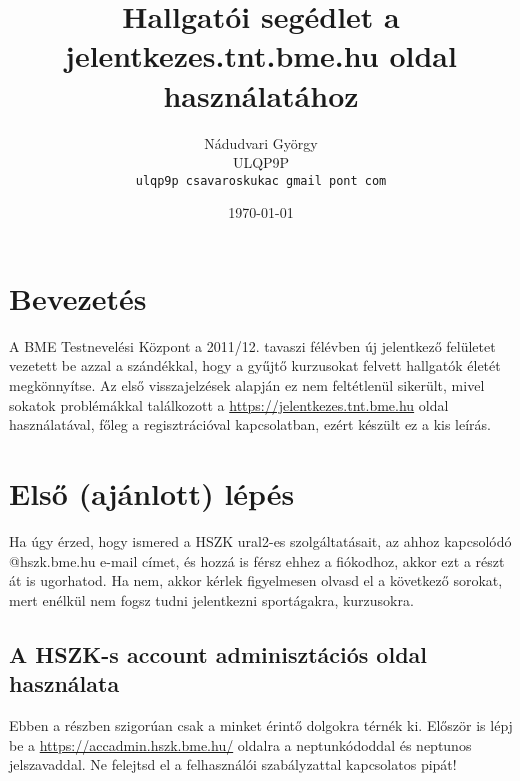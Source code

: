 \documentclass[a4paper,10pt,titlepage]{article}
\begin{document}


\begin{titlepage}
\title{Hallgatói segédlet a jelentkezes.tnt.bme.hu oldal használatához}
\author{Nádudvari György \\ ULQP9P \\
\texttt{ulqp9p csavaroskukac gmail pont com}}
\date{\today}
\end{titlepage}
\maketitle

\section{Bevezetés}

A BME Testnevelési Központ a 2011/12. tavaszi félévben új jelentkező felületet vezetett be azzal a szándékkal, hogy a gyűjtő kurzusokat felvett hallgatók életét megkönnyítse. Az első visszajelzések alapján ez nem feltétlenül sikerült, mivel sokatok problémákkal találkozott a \href{https://jelentkezes.tnt.bme.hu}{https://jelentkezes.tnt.bme.hu} oldal használatával, főleg a regisztrációval kapcsolatban, ezért készült ez a kis leírás.

\section{Első (ajánlott) lépés}

Ha úgy érzed, hogy ismered a HSZK ural2-es szolgáltatásait, az ahhoz kapcsolódó @hszk.bme.hu e-mail címet, és hozzá is férsz ehhez a fiókodhoz, akkor ezt a részt át is ugorhatod. Ha nem, akkor kérlek figyelmesen olvasd el a következő sorokat, mert enélkül nem fogsz tudni jelentkezni sportágakra, kurzusokra.

\subsection{A HSZK-s account adminisztációs oldal használata}

Ebben a részben szigorúan csak a minket érintő dolgokra térnék ki. Először is lépj be a \href{https://accadmin.hszk.bme.hu/}{https://accadmin.hszk.bme.hu/} oldalra a neptunkódoddal és neptunos jelszavaddal. Ne felejtsd el a felhasználói szabályzattal kapcsolatos pipát!
\end{document}
